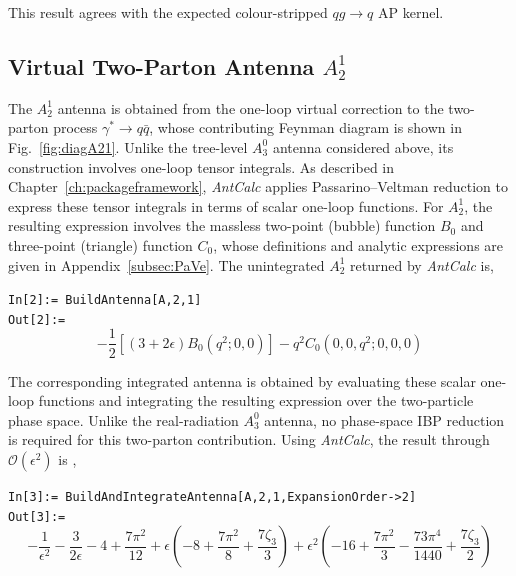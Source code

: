 This result agrees with the expected colour-stripped $qg\to q$ AP kernel. 

\subsection{Virtual Two-Parton Antenna $A_2^1$}\label{subsec:A21}

The $A_2^1$ antenna is obtained from the one-loop virtual correction to the two-parton process
$\gamma^*\to q\bar q$, whose contributing Feynman diagram is shown in Fig.~\ref{fig:diagA21}.
Unlike the tree-level $A_3^0$ antenna considered above, its construction involves one-loop tensor
integrals. As described in Chapter~\ref{ch:packageframework}, \textit{AntCalc} applies
Passarino--Veltman reduction to express these tensor integrals in terms of scalar one-loop functions.
For $A_2^1$, the resulting expression involves the massless two-point (bubble) function $B_0$ and
three-point (triangle) function $C_0$, whose definitions and analytic expressions are given in
Appendix~\ref{subsec:PaVe}. The unintegrated $A_2^1$ returned by \textit{AntCalc} is,



\begin{mdframed}[backgroundcolor=gray!10, linewidth=0pt]
\texttt{In[2]:= BuildAntenna[A,2,1]}\\
\hfill
\texttt{Out[2]:=}
    \begin{equation*}
        -\frac12\!\left[(3+2\epsilon)B_0\!\left(q^2;0,0\right)\right] - q^2C_0\!\left(0,0,q^2;0,0,0\right)
    \end{equation*}
\end{mdframed}

The corresponding integrated antenna is obtained by evaluating these scalar one-loop functions and
integrating the resulting expression over the two-particle phase space. Unlike the real-radiation
$A_3^0$ antenna, no phase-space IBP reduction is required for this two-parton contribution. Using
\textit{AntCalc}, the result through $\mathcal O(\epsilon^2)$ is \cite{Gehrmann-DeRidder:2005btv},

\begin{mdframed}[backgroundcolor=gray!10, linewidth=0pt]
\texttt{In[3]:= BuildAndIntegrateAntenna[A,2,1,ExpansionOrder->2]}\\
\hfill
\texttt{Out[3]:=}
    \begin{equation*}
        -\frac1{\epsilon^2}-\frac3{2\epsilon}-4+\frac{7\pi^2}{12}+\epsilon\!\left(-8+\frac{7\pi^2}8+\frac{7\zeta_3}3\right)+\epsilon^2\!\left(-16+\frac{7\pi^2}{3}-\frac{73\pi^4}{1440}+\frac{7\zeta_3}2\right)
    \end{equation*}
\end{mdframed}

